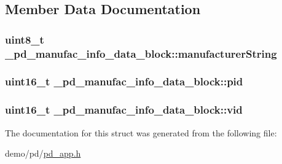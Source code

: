 \subsection{Member Data Documentation}
\hypertarget{struct__pd__manufac__info__data__block_a02e7724a7ade9d8136676933ec43b637}{
\subsubsection[{manufacturer\-String}]{\setlength{\rightskip}{0pt plus 5cm}uint8\-\_\-t \-\_\-pd\-\_\-manufac\-\_\-info\-\_\-data\-\_\-block\-::manufacturer\-String}}\label{struct__pd__manufac__info__data__block_a02e7724a7ade9d8136676933ec43b637}
\hypertarget{struct__pd__manufac__info__data__block_abe4afcb81048be6703607c1c2a21e25e}{
\subsubsection[{pid}]{\setlength{\rightskip}{0pt plus 5cm}uint16\-\_\-t \-\_\-pd\-\_\-manufac\-\_\-info\-\_\-data\-\_\-block\-::pid}}\label{struct__pd__manufac__info__data__block_abe4afcb81048be6703607c1c2a21e25e}
\hypertarget{struct__pd__manufac__info__data__block_a36cef0d659afc8d14083aeb98cdf3741}{
\subsubsection[{vid}]{\setlength{\rightskip}{0pt plus 5cm}uint16\-\_\-t \-\_\-pd\-\_\-manufac\-\_\-info\-\_\-data\-\_\-block\-::vid}}\label{struct__pd__manufac__info__data__block_a36cef0d659afc8d14083aeb98cdf3741}


The documentation for this struct was generated from the following file\-:\begin{DoxyCompactItemize}
\item 
demo/pd/\hyperlink{pd__app_8h}{pd\-\_\-app.\-h}\end{DoxyCompactItemize}
